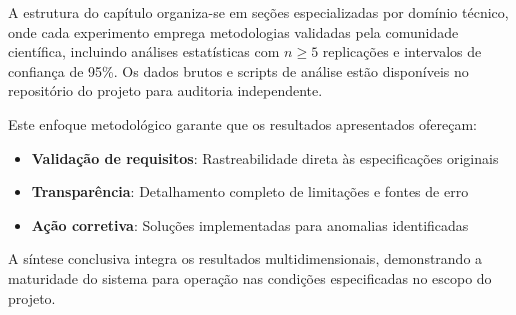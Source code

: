 A estrutura do capítulo organiza-se em seções especializadas por domínio técnico, onde cada experimento emprega metodologias validadas pela comunidade científica, incluindo análises estatísticas com $n \geq 5$ replicações e intervalos de confiança de 95\%. Os dados brutos e scripts de análise estão disponíveis no repositório do projeto para auditoria independente.

Este enfoque metodológico garante que os resultados apresentados ofereçam:
\begin{itemize}
    \item \textbf{Validação de requisitos}: Rastreabilidade direta às especificações originais
    \item \textbf{Transparência}: Detalhamento completo de limitações e fontes de erro
    \item \textbf{Ação corretiva}: Soluções implementadas para anomalias identificadas
\end{itemize}

A síntese conclusiva integra os resultados multidimensionais, demonstrando a maturidade do sistema para operação nas condições especificadas no escopo do projeto.







